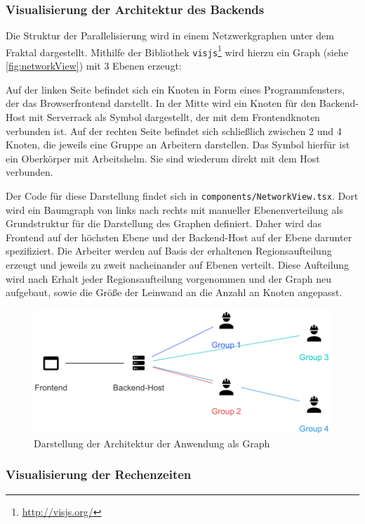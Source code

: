 \subsubsection{Visualisierung der Architektur des Backends}

Die Struktur der Parallelisierung wird in einem Netzwerkgraphen unter dem Fraktal dargestellt.
Mithilfe der Bibliothek \verb|visjs|\footnote{\url{http://visjs.org/}} wird hierzu ein
Graph (siehe \autoref{fig:networkView}) mit 3 Ebenen erzeugt:

Auf der linken Seite befindet sich ein Knoten in Form eines Programmfensters, der das Browserfrontend darstellt.
In der Mitte wird ein Knoten für den Backend-Host mit Serverrack als Symbol dargestellt, der mit dem Frontendknoten verbunden ist.
Auf der rechten Seite befindet sich schließlich zwischen 2 und 4 Knoten, die jeweils eine Gruppe an Arbeitern
darstellen. Das Symbol hierfür ist ein Oberkörper mit Arbeitshelm.
Sie sind wiederum direkt mit dem Host verbunden.

Der Code für diese Darstellung findet sich in \verb|components/NetworkView.tsx|.
Dort wird ein Baumgraph von links nach rechts mit manueller Ebenenverteilung als Grundstruktur für die Darstellung des Graphen definiert.
Daher wird das Frontend auf der höchsten Ebene und der Backend-Host auf der Ebene darunter spezifiziert.
Die Arbeiter werden auf Basis der erhaltenen Regionsaufteilung erzeugt und jeweils zu zweit nacheinander
auf Ebenen verteilt.
Diese Aufteilung wird nach Erhalt jeder Regionsaufteilung vorgenommen und der Graph neu aufgebaut,
sowie die Größe der Leinwand an die Anzahl an Knoten angepasst.

\begin{figure}
	\centering
	\includegraphics[width=0.5\linewidth]{img/Implementierung/NetworkView}
	\caption{Darstellung der Architektur der Anwendung als Graph
	}\label{fig:networkView}
\end{figure}

\subsubsection{Visualisierung der Rechenzeiten} %

